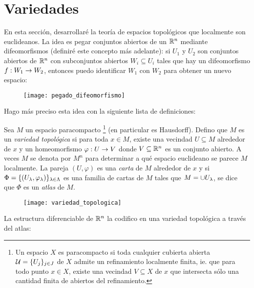 \documentclass[../../topologia_algebraica]{subfiles}
\begin{document}
\section{Variedades}\label{sec:variedades}

En esta secci\'on, desarrollar\'e la teor\'ia de espacios topol\'ogicos que localmente son
euclideanos. La idea es pegar conjuntos abiertos de un $\mathbb{R}^n$ mediante difeomorfismos
(definir\'e este concepto m\'as adelante): si $U_1$ y $U_2$ son conjuntos abiertos de $\mathbb{R}^n$
con subconjuntos abiertos $W_i\subseteq U_i$ tales que hay un difeomorfismo $f:W_1\rightarrow W_2$,
entonces puedo identificar $W_1$ con $W_2$ para obtener un nuevo espacio:

\begin{figure}[ht]%
  \centering
  \texttt{[image: pegado\_difeomorfismo]}
\end{figure}%

\noindent Hago m\'as preciso esta idea con la siguiente lista de definiciones:

\begin{defin}
  Sea $M$ un espacio paracompacto%
  \footnote{Un espacio $X$ es paracompacto si toda cualquier cubierta abierta
    $\mathcal{U}=\{U_j\}_{j\in J}$ de $X$ admite un refinamiento localmente finita, ie. que para todo
    punto $x\in X$, existe una vecindad $V\subseteq X$ de $x$ que intersecta s\'olo una
    cantidad finita de abiertos del refinamiento.}
  (en particular es Hausdorff). Defino que $M$ es un \emph{variedad topol\'ogica} si para toda
  $x\in M$, existe una vecindad $U\subseteq M$ alrededor de $x$ y un homeomorfismo
  $\varphi:U\rightarrow V$ donde $V\subseteq\mathbb{R}^n$ es un conjunto abierto. A veces $M$ se denota por
  $M^n$ para determinar a qu\'e espacio euclideano se parece $M$ localmente.
  La pareja $(U,\varphi)$ es una \emph{carta} de $M$ alrededor de $x$ y si
  $\Phi=\{(U_{\lambda},\varphi_{\lambda})\}_{\lambda\in\Lambda}$ es una familia de cartas de $M$ tales que
  $M=\cup U_{\lambda}$, se dice que $\Phi$ es un \emph{atlas} de $M$.
\end{defin}
\begin{figure}[ht]%
  \centering
  \texttt{[image: variedad\_topologica]}
\end{figure}%

La estructura diferenciable de $\mathbb{R}^n$ la codifico en una variedad topol\'ogica a trav\'es
del atlas:
\end{document}
